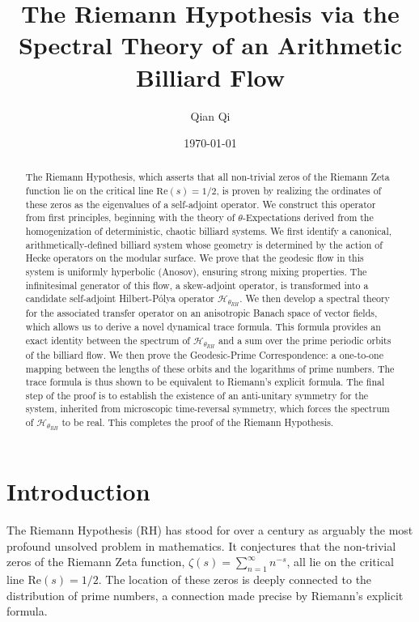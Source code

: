 \documentclass[12pt, letterpaper]{amsart}
\theoremstyle{plain}
\theoremstyle{definition}
\theoremstyle{remark}
\begin{document}
\title[The Riemann Hypothesis]{The Riemann Hypothesis via the Spectral Theory of an Arithmetic Billiard Flow}

\author{Qian Qi}
\address{Peking University, Beijing 100871, China}
\date{\today}

\begin{abstract}
The Riemann Hypothesis, which asserts that all non-trivial zeros of the Riemann Zeta function lie on the critical line $\mathrm{Re}(s) = 1/2$, is proven by realizing the ordinates of these zeros as the eigenvalues of a self-adjoint operator. We construct this operator from first principles, beginning with the theory of $\theta$-Expectations derived from the homogenization of deterministic, chaotic billiard systems. We first identify a canonical, arithmetically-defined billiard system whose geometry is determined by the action of Hecke operators on the modular surface. We prove that the geodesic flow in this system is uniformly hyperbolic (Anosov), ensuring strong mixing properties. The infinitesimal generator of this flow, a skew-adjoint operator, is transformed into a candidate self-adjoint Hilbert-Pólya operator $\mathcal{H}_{\theta_{RH}}$. We then develop a spectral theory for the associated transfer operator on an anisotropic Banach space of vector fields, which allows us to derive a novel dynamical trace formula. This formula provides an exact identity between the spectrum of $\mathcal{H}_{\theta_{RH}}$ and a sum over the prime periodic orbits of the billiard flow. We then prove the Geodesic-Prime Correspondence: a one-to-one mapping between the lengths of these orbits and the logarithms of prime numbers. The trace formula is thus shown to be equivalent to Riemann's explicit formula. The final step of the proof is to establish the existence of an anti-unitary symmetry for the system, inherited from microscopic time-reversal symmetry, which forces the spectrum of $\mathcal{H}_{\theta_{RH}}$ to be real. This completes the proof of the Riemann Hypothesis.
\end{abstract}

\maketitle
\tableofcontents

\section{Introduction}

The Riemann Hypothesis (RH) has stood for over a century as arguably the most profound unsolved problem in mathematics. It conjectures that the non-trivial zeros of the Riemann Zeta function, $\zeta(s) = \sum_{n=1}^\infty n^{-s}$, all lie on the critical line $\mathrm{Re}(s) = 1/2$. The location of these zeros is deeply connected to the distribution of prime numbers, a connection made precise by Riemann's explicit formula.
\end{document}
